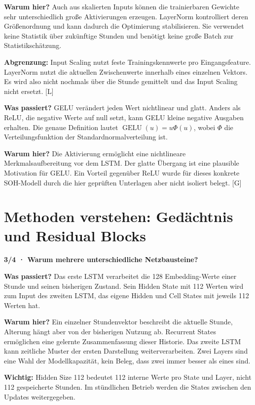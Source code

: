 \textbf{Warum hier?} Auch aus skalierten Inputs können die trainierbaren Gewichte sehr unterschiedlich große Aktivierungen erzeugen. LayerNorm kontrolliert deren Größenordnung und kann dadurch die Optimierung stabilisieren. Sie verwendet keine Statistik über zukünftige Stunden und benötigt keine große Batch zur Statistikschätzung.

\textbf{Abgrenzung:} Input Scaling nutzt feste Trainingskennwerte pro Eingangsfeature. LayerNorm nutzt die aktuellen Zwischenwerte innerhalb eines einzelnen Vektors. Es wird also nicht nochmals über die Stunde gemittelt und das Input Scaling nicht ersetzt. [L]

\textbf{Was passiert?} GELU verändert jeden Wert nichtlinear und glatt. Anders als ReLU, die negative Werte auf null setzt, kann GELU kleine negative Ausgaben erhalten. Die genaue Definition lautet $\operatorname{GELU}(u)=u\Phi(u)$, wobei $\Phi$ die Verteilungsfunktion der Standardnormalverteilung ist.

\textbf{Warum hier?} Die Aktivierung ermöglicht eine nichtlineare Merkmalsaufbereitung vor dem LSTM. Der glatte Übergang ist eine plausible Motivation für GELU. Ein Vorteil gegenüber ReLU wurde für dieses konkrete SOH-Modell durch die hier geprüften Unterlagen aber nicht isoliert belegt. [G]

\clearpage
\section*{\color{accent}Methoden verstehen: Gedächtnis und Residual Blocks}
\textbf{3/4 · Warum mehrere unterschiedliche Netzbausteine?}

\textbf{Was passiert?} Das erste LSTM verarbeitet die 128 Embedding-Werte einer Stunde und seinen bisherigen Zustand. Sein Hidden State mit 112 Werten wird zum Input des zweiten LSTM, das eigene Hidden und Cell States mit jeweils 112 Werten hat.

\textbf{Warum hier?} Ein einzelner Stundenvektor beschreibt die aktuelle Stunde, Alterung hängt aber von der bisherigen Nutzung ab. Recurrent States ermöglichen eine gelernte Zusammenfassung dieser Historie. Das zweite LSTM kann zeitliche Muster der ersten Darstellung weiterverarbeiten. Zwei Layers sind eine Wahl der Modellkapazität, kein Beleg, dass zwei immer besser als eines sind.

\textbf{Wichtig:} Hidden Size 112 bedeutet 112 interne Werte pro State und Layer, nicht 112 gespeicherte Stunden. Im stündlichen Betrieb werden die States zwischen den Updates weitergegeben.

